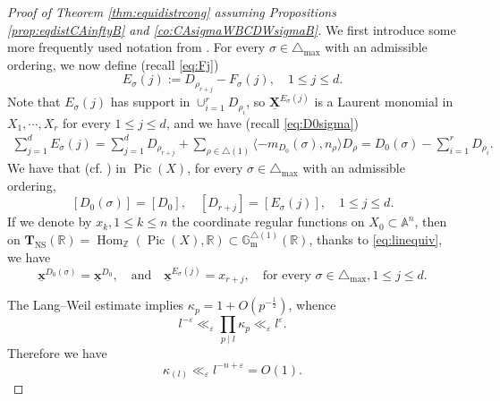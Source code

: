 \documentclass[11pt,letterpaper]{amsart}
\newcommand{\BA}{{\mathbb {A}}}
\newcommand{\BG}{{\mathbb {G}}}
\newcommand{\BR}{{\mathbb {R}}}
\newcommand{\BZ}{{\mathbb {Z}}}
\newcommand{\Hom}{\operatorname{Hom}}
\newcommand{\Pic}{\operatorname{Pic}}
\newcommand{\XX}{\underline{\mathbf{X}}}
\newcommand{\xx}{\underline{\mathbf{x}}}
\newcommand{\CTNS}{\mathbf{T}_{\operatorname{NS}}}
\theoremstyle{plain}
\numberwithin{equation}{section}
\theoremstyle{definition}
\theoremstyle{remark}
\begin{document}
\begin{proof}[Proof of Theorem \ref{thm:equidistrcong} assuming Propositions \ref{prop:eqdistCAinftyB} and \ref{co:CAsigmaWBCDWsigmaB}]\label{se:proofequistr}
We first introduce some more frequently used notation from  \cite[\S11]{Salberger}.
For every $\sigma\in\triangle_{\max}$ with an admissible ordering, we now define (recall \eqref{eq:Fj})
\begin{equation}\label{eq:Ej}
	E_\sigma(j):=D_{\rho_{r+j}}-F_\sigma(j),\quad 1\leqslant j\leqslant d.
\end{equation}
Note that $E_\sigma(j)$ has support in $\cup_{i=1}^r D_{\rho_i}$, so $\XX^{E_\sigma(j)}$ is a Laurent monomial in $X_1,\cdots,X_r$ for every $1\leqslant j\leqslant d$, and we have (recall \eqref{eq:D0sigma})
\begin{equation}\label{eq:EjDsigma}
	\begin{split}
		\sum_{j=1}^{d}E_\sigma(j)=\sum_{j=1}^{d}D_{\rho_{r+j}}+\sum_{\rho\in\triangle(1)}\langle -m_{D_0}(\sigma),n_\rho\rangle D_\rho=D_0(\sigma)-\sum_{i=1}^{r}D_{\rho_i}.
	\end{split}
\end{equation} 
We have that (cf. \cite[p. 249]{Salberger}) in $\Pic(X)$, for every $\sigma\in\triangle_{\max}$ with an admissible ordering, \begin{equation}\label{eq:linequiv}
	[D_0(\sigma)]=[D_0],\quad [D_{r+j}]=[E_{\sigma}(j)],\quad 1\leqslant j\leqslant d.
\end{equation}
If we denote by $x_k,1\leqslant k\leqslant n$ the coordinate regular functions on $X_0\subset\BA^n$, then on $\CTNS(\BR)=\Hom_\BZ(\Pic(X),\BR)\subset \BG_{\operatorname{m}}^{\triangle(1)}(\BR)$, thanks to \eqref{eq:linequiv}, we have
\begin{equation}\label{eq:coordfuneq}
	\xx^{D_0(\sigma)}=\xx^{D_0},\quad \text{and}\quad\xx^{E_{\sigma}(j)}=x_{r+j},\quad\text{for every }\sigma\in\triangle_{\max},1\leqslant j\leqslant d.
\end{equation} 


The Lang--Weil estimate \cite{Lang-Weil} implies
$\kappa_p=1+O(p^{-\frac{1}{2}})$, whence \begin{equation}\label{eq:LWkappa}
	l^{-\varepsilon}\ll_\varepsilon \prod_{p\mid l}\kappa_p\ll_\varepsilon l^\varepsilon.
\end{equation} Therefore we have \begin{equation}\label{eq:kappabd}
\kappa_{(l)}\ll_\varepsilon l^{-n+\varepsilon}=O(1).
\end{equation}


\end{proof}
\end{document}
